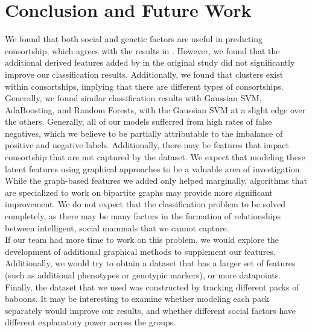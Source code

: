 \documentclass[twoside,twocolumn,paper=letter,fontsize=11pt]{article}
\begin{document}
\section{Conclusion and Future Work}

We found that both social and genetic factors are useful in predicting
consortship, which agrees with the results in \cite{Tung:2012}. However, we
found that the additional derived features added by in the original study did
not significantly improve our classification results. Additionally, we found
that clusters exist within consortships, implying that there are different types
of consortships.\\

Generally, we found similar classification results with Gaussian SVM,
AdaBoosting, and Random Forests, with the Gaussian SVM at a slight edge over the
others. Generally, all of our models sufferred from high rates of false
negatives, which we believe to be partially attributable to the imbalance of
positive and negative labels. Additionally, there may be features that impact
consortship that are not captured by the dataset. We expect that modeling these
latent features using graphical approaches to be a valuable area of
investigation. While the graph-based features we added only helped marginally,
algorithms that are specialized to work on bipartite graphs may provide more
significant improvement. We do not expect that the classification problem to be
solved completely, as there may be many factors in the formation of
relationships between intelligent, social mammals that we cannot capture.
\\

If our team had more time to work on this problem, we would explore the
development of additional graphical methods to supplement our features.
Additionally, we would try to obtain a dataset that has a larger set of features
(such as additional phenotypes or genotypic markers), or more datapoints.
Finally, the dataset that we used was constructed by tracking different packs of
baboons. It may be interesting to examine whether modeling each pack separately
would improve our results, and whether different social factors have different
explanatory power across the groups.
\\

\end{document}
